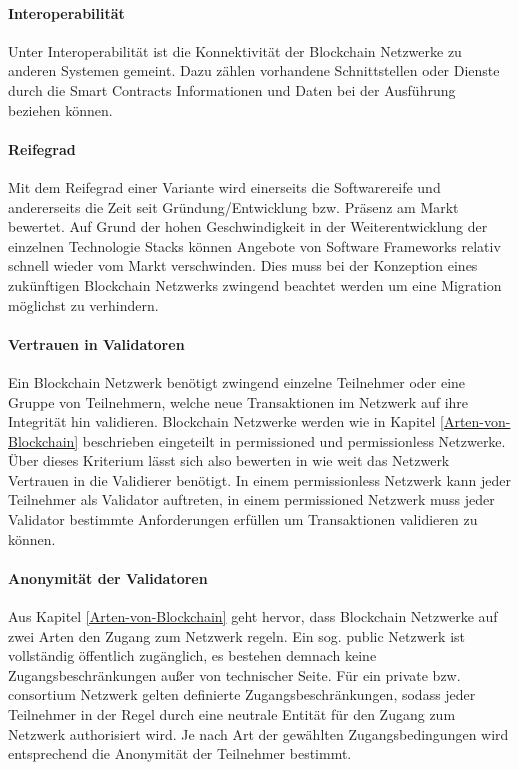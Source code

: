 \paragraph{Interoperabilität}
Unter Interoperabilität ist die Konnektivität der Blockchain Netzwerke zu anderen Systemen gemeint. Dazu zählen vorhandene Schnittstellen oder Dienste durch die Smart Contracts Informationen und Daten bei der Ausführung beziehen können. 

\paragraph{Reifegrad}
Mit dem Reifegrad einer Variante wird einerseits die Softwarereife und andererseits die Zeit seit Gründung/Entwicklung bzw. Präsenz am Markt bewertet. Auf Grund der hohen Geschwindigkeit in der Weiterentwicklung der einzelnen Technologie \glqq Stacks\grqq{} können Angebote von Software Frameworks relativ schnell wieder vom Markt verschwinden. Dies muss bei der Konzeption eines zukünftigen Blockchain Netzwerks zwingend beachtet werden um eine Migration möglichst zu verhindern.

\paragraph{Vertrauen in Validatoren}
Ein Blockchain Netzwerk benötigt zwingend einzelne Teilnehmer oder eine Gruppe von Teilnehmern, welche neue Transaktionen im Netzwerk auf ihre Integrität hin validieren. Blockchain Netzwerke werden wie in Kapitel \ref{Arten-von-Blockchain} beschrieben eingeteilt in permissioned und permissionless Netzwerke. Über dieses Kriterium lässt sich also bewerten in wie weit das Netzwerk Vertrauen in die Validierer benötigt. In einem permissionless Netzwerk kann jeder Teilnehmer als Validator auftreten, in einem permissioned Netzwerk muss jeder Validator bestimmte Anforderungen erfüllen um Transaktionen validieren zu können.

\paragraph{Anonymität der Validatoren}
Aus Kapitel \ref{Arten-von-Blockchain} geht hervor, dass Blockchain Netzwerke auf zwei Arten den Zugang zum Netzwerk regeln. Ein sog. public Netzwerk ist vollständig öffentlich zugänglich, es bestehen demnach keine Zugangsbeschränkungen außer von technischer Seite. Für ein private bzw. consortium Netzwerk gelten definierte Zugangsbeschränkungen, sodass jeder Teilnehmer in der Regel durch eine neutrale Entität für den Zugang zum Netzwerk authorisiert wird. Je nach Art der gewählten Zugangsbedingungen wird entsprechend die Anonymität der Teilnehmer bestimmt.

